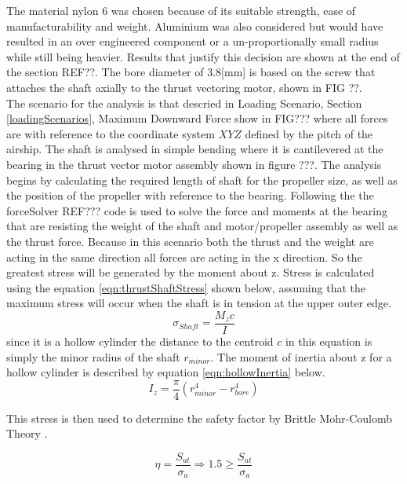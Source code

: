 \documentclass[../main.tex]{subfiles}
\begin{document}
The material nylon 6 was chosen because of its suitable strength, ease of manufacturability and weight. Aluminium was also considered but would have resulted in an over engineered component or a un-proportionally small radius while still being heavier. Results that justify this decision are shown at the end of the section REF??. The bore diameter of 3.8[mm] is based on the screw that attaches the shaft axially to the thrust vectoring motor, shown in FIG ??.\\

The scenario for the analysis is that descried in Loading Scenario, Section \ref{loadingScenarios}, Maximum Downward Force show in FIG??? where all forces are with reference to the coordinate system $XYZ$ defined by the pitch of the airship. The shaft is analysed in simple bending where it is cantilevered at the bearing in the thrust vector motor assembly shown in figure ???. The analysis begins by calculating the required length of shaft for the propeller size, as well as the position of the propeller with reference to the bearing. Following the the forceSolver REF??? code is used to solve the force and moments at the bearing that are resisting the weight of the shaft and motor/propeller assembly as well as the thrust force. Because in this scenario both the thrust and the weight are acting in the same direction all forces are acting in the x direction. So the greatest stress will be generated by the moment about z. Stress is calculated using the equation \ref{eqn:thrustShaftStress} shown below, assuming that the maximum stress will occur when the shaft is in tension at the upper outer edge. 
\begin{equation}
\label{eqn:thrustShaftStress} 
\sigma _{Shaft}  = \dfrac{M_{z}c}{I} 
\end{equation}
since it is a hollow cylinder the distance to the centroid $c$ in this equation is simply the minor radius of the shaft $r_{minor}$. The moment of inertia about z for a hollow cylinder is described by equation \ref{eqn:hollowInertia} below.
\begin{equation}
\label{eqn:hollowInertia} 
I _{z}  = \dfrac{\pi}{4} (r_{minor}^4 - r_{bore}^4)
\end{equation}

This stress is then used to determine the safety factor by Brittle Mohr-Coulomb Theory \cite[227]{shigley}.

\begin{equation}
\eta = \dfrac{S_{ut}}{\sigma _a} \Rightarrow 1.5 \geq \dfrac{S_{ut}}{\sigma _a}
\end{equation}
\end{document}
